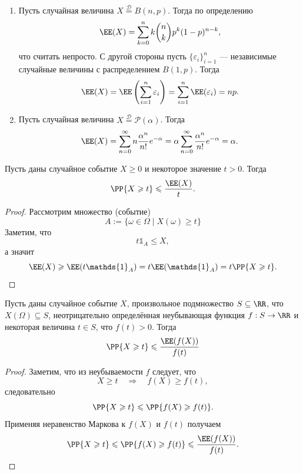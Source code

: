 \documentclass[12pt,a4paper]{article}
\newcommand{\ind}{\ensuremath{\mathds{1}}\xspace}
\newcommand{\Deq}{\mathrel{\stackrel{\mathcal{D}}{=}}}
\begin{document}
    \begin{example}\ 
        \begin{enumerate}
            \item Пусть случайная величина $X \Deq B(n, p)$. Тогда по определению
                \[\EE(X) = \sum_{k=0}^n k \binom{n}{k} p^k (1-p)^{n-k},\]
                что считать непросто. С другой стороны пусть $\{\varepsilon_i\}_{i=1}^n$ --- независимые случайные величины с распределением $B(1, p)$. Тогда
                \[\EE(X) = \EE\left(\sum_{i=1}^n \varepsilon_i\right) = \sum_{i=1}^n \EE(\varepsilon_i) = np.\]
            \item Пусть случайная величина $X \Deq \mathcal{P}(\alpha)$. Тогда
                \[\EE(X) = \sum_{n=0}^\infty n \frac{\alpha^n}{n!} e^{-\alpha} = \alpha \sum_{n=0}^\infty \frac{\alpha^n}{n!} e^{-\alpha} = \alpha.\]
        \end{enumerate}
    \end{example}

    \begin{theorem}
        Пусть даны случайное событие $X \geqslant 0$ и некоторое значение $t > 0$. Тогда
        \[\PP\{X \geqslant t\} \leqslant \frac{\EE(X)}{t}.\]
    \end{theorem}

    \begin{proof}
        Рассмотрим множество (событие)
        \[A := \{\omega \in \Omega \mid X(\omega) \geqslant t\}\]
        Заметим, что
        \[t \ind_A \leqslant X,\]
        а значит
        \[\EE(X) \geqslant \EE(t \ind_A) = t \EE(\ind_A) = t \PP\{X \geqslant t\}.\]
    \end{proof}

    \begin{corollary}\label{Markov-inequality-theorem-functional-corollary}
        Пусть даны случайное событие $X$, произвольное подмножество $S \subseteq \RR$, что $X(\Omega) \subseteq S$, неотрицательно определённая неубывающая функция $f: S \to \RR$ и некоторая величина $t \in S$, что $f(t) > 0$. Тогда
        \[\PP\{X \geqslant t\} \leqslant \frac{\EE(f(X))}{f(t)}\]
    \end{corollary}

    \begin{proof}
        Заметим, что из неубываемости $f$ следует, что
        \[X \geqslant t \quad \Longrightarrow \quad f(X) \geqslant f(t),\]
        следовательно
        \[\PP\{X \geqslant t\} \leqslant \PP\{f(X) \geqslant f(t)\}.\]
        Применяя неравенство Маркова к $f(X)$ и $f(t)$ получаем
        \[\PP\{X \geqslant t\} \leqslant \PP\{f(X) \geqslant f(t)\} \leqslant \frac{\EE(f(X))}{f(t)}.\]
    \end{proof}
\end{document}
